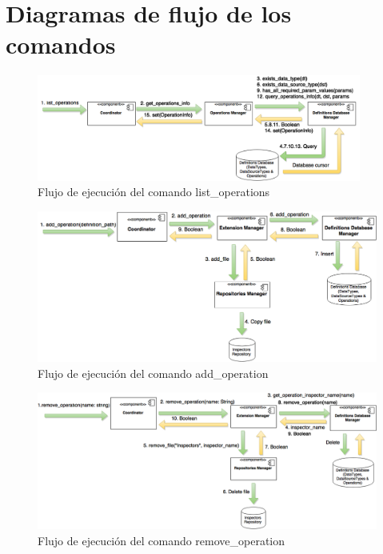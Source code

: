 \chapter{Diagramas de flujo de los comandos}
\label{diagramasFlujo}
\begin{figure}[H]
    \begin{center}
        \includegraphics[width=0.95\textwidth]{figures/list_operations}
        \caption{Flujo de ejecución del comando list\_operations}
    \end{center}
\end{figure}

\begin{figure}[H]
    \begin{center}
        \includegraphics[width=\textwidth]{figures/add_operation}
        \caption{Flujo de ejecución del comando add\_operation}
    \end{center}
\end{figure}

\begin{figure}[H]
    \begin{center}
        \includegraphics[width=\textwidth]{figures/remove_operation}
        \caption{Flujo de ejecución del comando remove\_operation}
    \end{center}
\end{figure}


